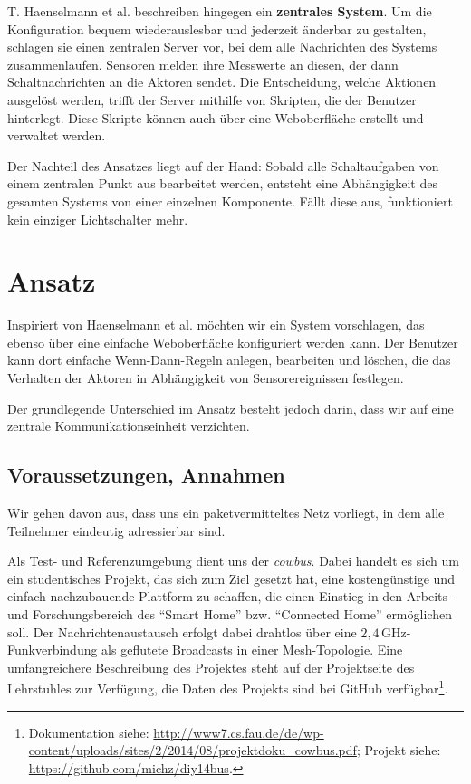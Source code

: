 \documentclass[conference]{IEEEtran}
\begin{document}
    T. Haenselmann et al. \cite{haenselmann2007skriptbasierte}
    beschreiben hingegen ein \textbf{zentrales System}.
    Um die Konfiguration bequem wiederauslesbar und jederzeit änderbar
    zu gestalten, schlagen sie einen zentralen Server vor,
    bei dem alle Nachrichten des Systems zusammenlaufen.
    Sensoren melden ihre Messwerte an diesen, der dann Schaltnachrichten
    an die Aktoren sendet.
    Die Entscheidung, welche Aktionen ausgelöst werden, trifft der Server
    mithilfe von Skripten, die der Benutzer hinterlegt.
    Diese Skripte können auch über eine Weboberfläche erstellt und
    verwaltet werden.

    Der Nachteil des Ansatzes liegt auf der Hand:
    Sobald alle Schaltaufgaben von einem zentralen Punkt aus bearbeitet
    werden, entsteht eine Abhängigkeit des gesamten Systems von einer
    einzelnen Komponente.
    Fällt diese aus, funktioniert kein einziger Lichtschalter mehr.

\section{Ansatz}
    Inspiriert von Haenselmann et al. \cite{haenselmann2007skriptbasierte}
    möchten wir ein System vorschlagen,
    das ebenso über eine einfache Weboberfläche konfiguriert werden kann.
    Der Benutzer kann dort einfache Wenn-Dann-Regeln anlegen, bearbeiten und
    löschen, die das Verhalten der Aktoren in Abhängigkeit von Sensorereignissen
    festlegen.

    Der grundlegende Unterschied im Ansatz besteht jedoch darin,
    dass wir auf eine zentrale Kommunikationseinheit verzichten.

    \subsection{Voraussetzungen, Annahmen}
        Wir gehen davon aus, dass uns ein paketvermitteltes Netz vorliegt,
        in dem alle Teilnehmer eindeutig adressierbar sind.

        Als Test- und Referenzumgebung dient uns der \emph{cowbus}.
        Dabei handelt es sich um ein studentisches Projekt,
        das sich zum Ziel gesetzt hat,
        eine kostengünstige und einfach nachzubauende Plattform zu schaffen,
        die einen Einstieg in den Arbeits- und Forschungsbereich des
        \enquote{Smart Home} bzw. \enquote{Connected Home} ermöglichen soll.
        Der Nachrichtenaustausch erfolgt dabei drahtlos über eine
        $2,4$\,GHz-Funkverbindung als geflutete Broadcasts in einer
        Mesh-Topologie.
        Eine umfangreichere Beschreibung des Projektes
        steht auf der Projektseite des Lehrstuhles zur Verfügung,
        die Daten des Projekts sind bei GitHub
        verfügbar\footnote{Dokumentation siehe: \url{http://www7.cs.fau.de/de/wp-content/uploads/sites/2/2014/08/projektdoku_cowbus.pdf}; Projekt siehe: \url{https://github.com/michz/diy14bus}.}.
\end{document}
